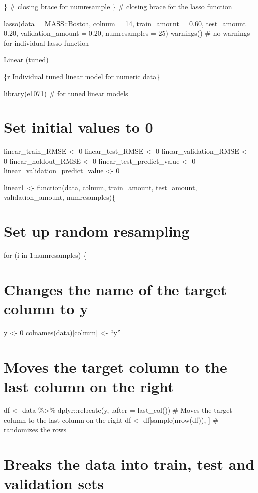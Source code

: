 \documentclass[
]{book}
\begin{document}
\} \# closing brace for numresample \} \# closing brace for the lasso
function

lasso(data = MASS::Boston, colnum = 14, train\_amount = 0.60, test\_amount
= 0.20, validation\_amount = 0.20, numresamples = 25) warnings() \# no
warnings for individual lasso function

Linear (tuned)

\{r Individual tuned linear model for numeric data\}

library(e1071) \# for tuned linear models

\chapter{Set initial values to 0}\label{set-initial-values-to-0-9}

linear\_train\_RMSE \textless- 0 linear\_test\_RMSE \textless- 0 linear\_validation\_RMSE
\textless- 0 linear\_holdout\_RMSE \textless- 0 linear\_test\_predict\_value \textless- 0
linear\_validation\_predict\_value \textless- 0

linear1 \textless- function(data, colnum, train\_amount, test\_amount,
validation\_amount, numresamples)\{

\chapter{Set up random resampling}\label{set-up-random-resampling-7}

for (i in 1:numresamples) \{

\chapter{Changes the name of the target column to y}\label{changes-the-name-of-the-target-column-to-y-7}

y \textless- 0 colnames(data){[}colnum{]} \textless- ``y''

\chapter{Moves the target column to the last column on the right}\label{moves-the-target-column-to-the-last-column-on-the-right-7}

df \textless- data \%\textgreater\% dplyr::relocate(y, .after = last\_col()) \# Moves the
target column to the last column on the right df \textless-
df{[}sample(nrow(df)), {]} \# randomizes the rows

\chapter{Breaks the data into train, test and validation sets}\label{breaks-the-data-into-train-test-and-validation-sets-7}
\end{document}
